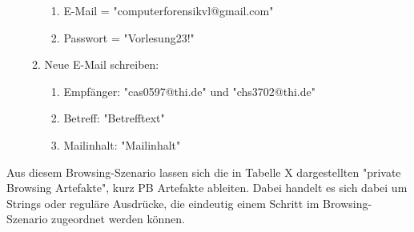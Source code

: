 \begin{enumerate}
\begin{enumerate}[label*=\arabic*.]
			\begin{enumerate}[label*=\arabic*.]
			\item E-Mail = "computerforensikvl@gmail.com"
			\item Passwort = "Vorlesung23!"
			\end{enumerate}
	\item Neue E-Mail schreiben:
			\begin{enumerate}[label*=\arabic*.]
			\item Empfänger: "cas0597@thi.de" und "chs3702@thi.de"
			\item Betreff: "Betrefftext"
			\item Mailinhalt: "Mailinhalt"
			\end{enumerate}			
	\end{enumerate}
\end{enumerate}

Aus diesem Browsing-Szenario lassen sich die in Tabelle X dargestellten "private Browsing Artefakte", kurz PB Artefakte ableiten. Dabei handelt es sich dabei um Strings oder reguläre Ausdrücke, die eindeutig einem Schritt im Browsing-Szenario zugeordnet werden können.

